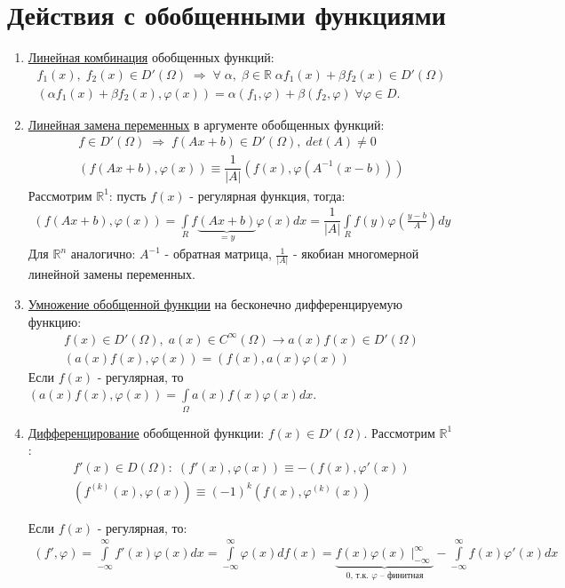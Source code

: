 \section*{Действия с обобщенными функциями}

\begin{enumerate}
	\item \underline{Линейная комбинация} обобщенных функций:
		$$\begin{gathered}
			f_1(x), \; f_2(x) \in D'(\Omega) \; \Rightarrow \;  \forall \; \alpha, \; \beta \in \mathbb{R} \; \alpha f_1(x) + \beta f_2(x) \in D'(\Omega) \\
			(\alpha f_1(x) + \beta f_2(x), \varphi(x)) = \alpha (f_1, \varphi) + \beta (f_2, \varphi) \; \forall \varphi \in D.
		\end{gathered}$$
	\item \underline{Линейная замена переменных} в аргументе обобщенных функций:
		$$\begin{gathered}
			f \in D'(\Omega) \; \Rightarrow \;  f(Ax + b) \in D'(\Omega), \; det(A) \neq 0 \\
			(f(Ax + b), \varphi(x)) \equiv \dfrac{1}{|A|} (f(x), \varphi(A^{-1}(x - b)))
		\end{gathered}$$
		Рассмотрим $\mathbb{R}^1$: пусть $f(x)$ - регулярная функция, тогда:
		$$\begin{gathered}
			(f(Ax + b), \varphi(x)) = \int\limits_{R}f\underbrace{(Ax + b)}_{= y}\varphi(x)dx = \dfrac{1}{|A|}\int\limits_{R}f(y)\varphi(\frac{y - b}{A})dy
		\end{gathered}$$
		Для $\mathbb{R}^n$ аналогично: $A^{-1}$ - обратная матрица, $\frac{1}{|A|}$ - якобиан многомерной линейной замены переменных.
	\item \underline{Умножение обобщенной функции} на бесконечно дифференцируемую функцию:
		$$\begin{gathered}
			f(x) \in D'(\Omega), \; a(x) \in C^{\infty}(\Omega) \longrightarrow a(x)f(x) \in D'(\Omega) \\
			(a(x)f(x), \varphi(x)) = (f(x), a(x)\varphi(x))
		\end{gathered}$$
		Если $f(x)$ - регулярная, то $(a(x)f(x), \varphi(x)) = \int\limits_{\Omega} a(x)f(x) \varphi(x) dx$.
	\item \underline{Дифференцирование} обобщенной функции: $ f(x) \in D'(\Omega). $
		Рассмотрим $\mathbb{R}^1$: 
		$$\begin{gathered}
			f'(x) \in D(\Omega): \; (f'(x), \varphi(x)) \equiv - (f(x), \varphi'(x)) \\
			(f^{(k)}(x), \varphi(x)) \equiv (-1)^k(f(x), \varphi^{(k)}(x))
		\end{gathered}$$

		Если $f(x)$ - регулярная, то:
		$$\begin{gathered}
			(f', \varphi) = \int\limits_{-\infty}^{\infty}
			f'(x)\varphi(x)dx = \int\limits_{-\infty}^{\infty} \varphi(x)df(x) = \underbrace{f(x)\varphi(x) \mid_{-\infty}^{\infty}}_{ 0 \text{, т.к. } \varphi \text{ -- финитная}} - \int\limits_{-\infty}^{\infty} f(x)\varphi'(x)dx
		\end{gathered}$$
\end{enumerate}

